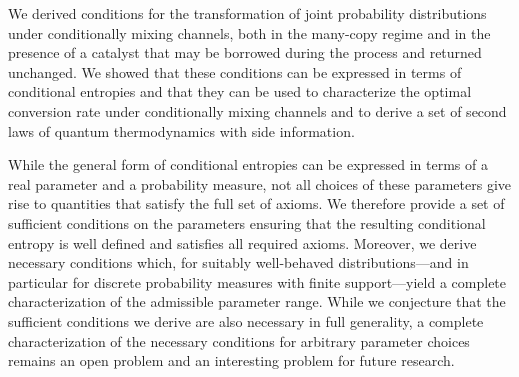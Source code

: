 \documentclass[aps,pra,11pt,onecolumn,nofootinbib,tightenlines]{revtex4-2}
\theoremstyle{definition}
\begin{document}
We derived conditions for the transformation of joint probability distributions under conditionally mixing channels, both in the many-copy regime and in the presence of a catalyst that may be borrowed during the process and returned unchanged. We showed that these conditions can be expressed in terms of conditional entropies
and that they can be used to characterize the optimal conversion rate under conditionally mixing channels and to derive a set of second laws of quantum thermodynamics with side information.

While the general form of conditional entropies can be expressed in terms of a real parameter and a probability measure, not all choices of these parameters give rise to quantities that satisfy the full set of axioms. 
We therefore provide a set of sufficient conditions on the parameters ensuring that the resulting conditional entropy is well defined and satisfies all required axioms. 
Moreover, we derive necessary conditions which, for suitably well-behaved distributions—and in particular for discrete probability measures with finite support—yield a complete characterization of the admissible parameter range.
While we conjecture that the sufficient conditions we derive are also necessary in full generality, a complete characterization of the necessary conditions for arbitrary parameter choices remains an open problem and an interesting problem for future research.
\end{document}

